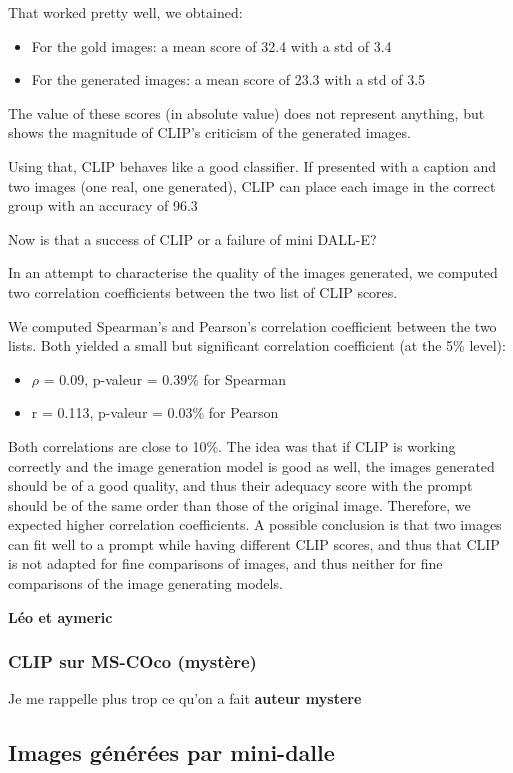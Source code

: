 \documentclass{article}
\begin{document}
That worked pretty well, we obtained:
\begin{itemize}
    \item For the gold images: a mean score of 32.4 with a std of 3.4
    \item For the generated images: a mean score of 23.3 with a std of 3.5
\end{itemize}

The value of these scores (in absolute value) does not represent anything, but shows the magnitude of CLIP's criticism of the generated images.

Using that, CLIP behaves like a good classifier. If presented with a caption and two images (one real, one generated), CLIP can place each image in the correct group with an accuracy of 96.3%

Now is that a success of CLIP or a failure of mini DALL-E?

In an attempt to characterise the quality of the images generated, we computed two correlation coefficients between the two list of CLIP scores.

We computed Spearman's and Pearson's correlation coefficient between the two lists. Both yielded a small but significant correlation coefficient (at the 5\% level):
\begin{itemize}
    \item $\rho$ = 0.09, p-valeur = 0.39\% for Spearman
    \item r = 0.113, p-valeur = 0.03\% for Pearson
\end{itemize}
Both correlations are close to 10\%. The idea was that if CLIP is working correctly and the image generation model is good as well, the images generated should be of a good quality, and thus their adequacy score with the prompt should be of the same order than those of the original image. Therefore, we expected higher correlation coefficients. 
A possible conclusion is that two images can fit well to a prompt while having different CLIP scores, and thus that CLIP is not adapted for fine comparisons of images, and thus neither for fine comparisons of the image generating models. 


\textbf{Léo et aymeric}

\subsubsection{CLIP sur MS-COco (mystère)}
Je me rappelle plus trop ce qu'on a fait
\textbf{auteur mystere}

\subsection{Images générées par mini-dalle}
\end{document}
